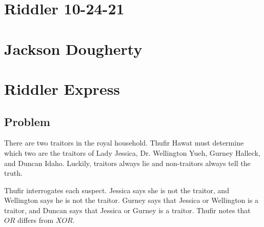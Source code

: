 \documentclass[reqno]{amsart}
\begin{document}
\section*{Riddler 10-24-21}
\section*{Jackson Dougherty}

\section{Riddler Express}

\subsection*{Problem}

There are two traitors in the royal household. Thufir Hawat must determine which two are the traitors of Lady Jessica, Dr. Wellington Yueh, Gurney Halleck, and Duncan Idaho. Luckily, traitors always lie and non-traitors always tell the truth.

Thufir interrogates each suspect. Jessica says she is not the traitor, and Wellington says he is not the traitor. Gurney says that Jessica or Wellington is a traitor, and Duncan says that Jessica or Gurney is a traitor. Thufir notes that $OR$ differs from $XOR$.  
\end{document}

